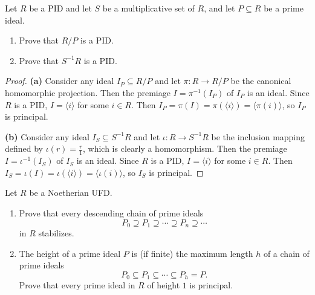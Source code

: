 \documentclass[addpoints,10pt]{exam}
\theoremstyle{plain}
\theoremstyle{definition}
\newtheorem{prob}[thm]{Problem}
\theoremstyle{plain}
\theoremstyle{plain}
\theoremstyle{definition}
\let\oldprob\prob
\let\endoldprob\endprob
\renewenvironment{prob}
  {\begin{singlespace}\oldprob}
  {\endoldprob\end{singlespace}}
\begin{document}
\newpage
\begin{prob}
Let $R$ be a PID and let $S$ be a multiplicative set of $R$, and let $P \subseteq R$ be a prime ideal.
\begin{enumerate}[label=(\alph*)]
\item Prove that $R/P$ is a PID.
\item Prove that $S^{-1}R$ is a PID.
\end{enumerate}
\end{prob}
\begin{proof}
    \textbf{(a)} Consider any ideal $I_{P}\subseteq R/P$ and let $\pi:R\to R/P$ be the canonical homomorphic projection. Then the premiage $I=\pi^{-1}(I_{P})$ of $I_{P}$ is an ideal. Since $R$ is a PID, $I=\langle i\rangle$ for some $i \in R$. Then $I_{P}=\pi(I)=\pi(\langle i\rangle)=\langle \pi(i)\rangle$, so $I_{P}$ is principal.

    \textbf{(b)} Consider any ideal $I_{S}\subseteq S^{-1}R$ and let $\iota:R\to S^{-1}R$ be the inclusion mapping defined by $\iota(r)=\frac{r}{1}$, which is clearly a homomorphism. Then the premiage $I=\iota^{-1}(I_{S})$ of $I_{S}$ is an ideal. Since $R$ is a PID, $I=\langle i\rangle$ for some $i \in R$. Then $I_{S}=\iota(I)=\iota(\langle i\rangle)=\langle \iota(i)\rangle$, so $I_{S}$ is principal.
\end{proof}

\newpage
\begin{prob}
Let $R$ be a Noetherian UFD.
\begin{enumerate}[label=(\alph*)]
\item Prove that every descending chain of prime ideals
$$
P_0 \supseteq P_1 \supseteq \cdots \supseteq P_n \supseteq \cdots
$$
in $R$ stabilizes.
\item The height of a prime ideal $P$ is (if finite) the maximum length $h$ of a chain of prime ideals
$$
P_0 \subseteq P_1 \subseteq \cdots \subseteq P_h = P.
$$
Prove that every prime ideal in $R$ of height $1$ is principal.
\end{enumerate}
\end{prob}
\end{document}
